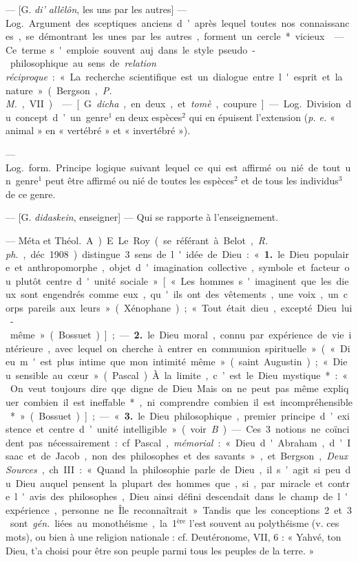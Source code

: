 \begin{itemize}[leftmargin=1cm, label=, itemsep=1pt]
 — [G. {\it di’ allêlôn}, les uns par les
autres] — \si{Log.} Argument des
sceptiques anciens d’après lequel
toutes nos connaissances, se démontrant les unes par les autres, forment un cercle* vicieux.

 — Ce terme s'emploie souvent auj. dans le style pseudo-philosophique au sens de {\it relation réciproque} : « La recherche scientifique
est un dialogue entre l'esprit et la
nature » (Bergson, {\it P. M.}, VII).

 — [G. {\it dicha}, en deux, et
{\it tomè}, coupure] — \si{Log.} Division
du concept d’un genre$^1$ en deux espèces$^2$ qui en épuisent l’extension
({\it p. e.} « animal » en « vertébré » et
« invertébré »).

 — \si{Log.}
\si{form.} Principe logique suivant lequel ce qui est affirmé ou nié de
tout un genre$^1$ peut être affirmé ou
nié de toutes les espèces$^2$ et de tous
les individus$^3$ de ce genre.

 — [G. {\it didaskein}, enseigner]
— Qui se rapporte à l’enseignement.

 — Méta et \si{Théol.} A) E. Le Roy
(se référant à Belot, {\it R. ph.}, déc.1908)
distingue 3 sens de l'idée de Dieu :
« {\bf 1.} le Dieu populaire et anthropomorphe, objet d'imagination collective, symbole et facteur ou plutôt
centre d'unité sociale» [« Les hommes
s'imaginent que les dieux sont engendrés comme eux, qu'ils ont des
vêtements, une voix, un corps
pareils aux leurs » (Xénophane);
« Tout était dieu, excepté Dieu lui-même » (Bossuet)]; — {\bf 2.} le Dieu
moral, connu par expérience de vie
intérieure, avec lequel on cherche à
entrer en communion spirituelle »
(« Dieu m'est plus intime que mon
intimité même » (saint Augustin);
« Dieu sensible au cœur » (Pascal).
À la limite, c’est le Dieu mystique* :
« On veut toujours dire qqe. digne
de Dieu... Mais on ne peut pas même
expliquer combien il est ineffable*,
ni comprendre combien il est incompréhensible* » (Bossuet)]; —
« {\bf 3.} le Dieu philosophique, premier
principe d’existence et centre d’unité
intelligible » (voir {\it B}). — Ces 3 notions ne coïncident pas nécessairement : cf. Pascal, {\it mémorial} : « Dieu
d'Abraham, d’Isaac et de Jacob,
non des philosophes et des savants »,
et Bergson, {\it Deux Sources}, ch. III :
« Quand la philosophie parle de
Dieu,... il s’agit si peu du Dieu
auquel pensent la plupart des
hommes que, si, par miracle et
contre l'avis des philosophes, Dieu
ainsi défini descendait dans le champ
de l'expérience, personne ne Île
reconnaîtrait. » Tandis que les conceptions 2 et 3 sont {\it gén.} liées au
monothéisme, la 1$^\text{ère}$ l’est souvent au
polythéisme (v. ces mots), ou bien à
une religion nationale : cf. Deutéronome, VII, 6 : « Yahvé, ton Dieu,
t'a choisi pour être son peuple parmi
tous les peuples de la terre. »


\end{itemize}
